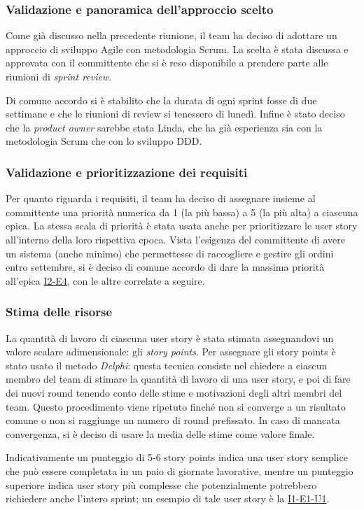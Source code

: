 \subsubsection{Validazione e panoramica dell'approccio scelto}
Come già discusso nella precedente riunione, il team ha deciso di adottare un approccio di sviluppo Agile con metodologia Scrum. La scelta è stata discussa e approvata con il committente che si è reso disponibile a prendere parte alle riunioni di \emph{sprint review}.

Di comune accordo si è stabilito che la durata di ogni sprint fosse di due settimane e che le riunioni di review si tenessero di lunedì. Infine è stato deciso che la \emph{product owner} sarebbe stata Linda, che ha già esperienza sia con la metodologia Scrum che con lo sviluppo DDD.

\subsubsection{Validazione e prioritizzazione dei requisiti}
Per quanto riguarda i requisiti, il team ha deciso di assegnare insieme al committente una priorità numerica da 1 (la più bassa) a 5 (la più alta) a ciascuna epica.
La stessa scala di priorità è stata usata anche per prioritizzare le user story all'interno della loro rispettiva epoca.
Vista l'esigenza del committente di avere un sistema (anche minimo) che permettesse di raccogliere e gestire gli ordini entro settembre, si è deciso di comune accordo di dare la massima priorità all'epica \href{user-story:i2-e4}{I2-E4}, con le altre correlate a seguire.

\subsubsection{Stima delle risorse}
La quantità di lavoro di ciascuna user story è stata stimata assegnandovi un valore scalare adimensionale: gli \emph{story points}.
Per assegnare gli story points è stato usato il metodo \emph{Delphi}: questa tecnica consiste nel chiedere a ciascun membro del team di stimare la quantità di lavoro di una user story, e poi di fare dei nuovi round tenendo conto delle stime e motivazioni degli altri membri del team. Questo procedimento viene ripetuto finché non si converge a un risultato comune o non si raggiunge un numero di round prefissato.
In caso di mancata convergenza, si è deciso di usare la media delle stime come valore finale.

Indicativamente un punteggio di 5-6 story points indica una user story semplice che può essere completata in un paio di giornate lavorative, mentre un punteggio superiore indica user story più complesse che potenzialmente potrebbero richiedere anche l'intero sprint; un esempio di tale user story è la \href{user-story:i1-e1-u1}{I1-E1-U1}.

